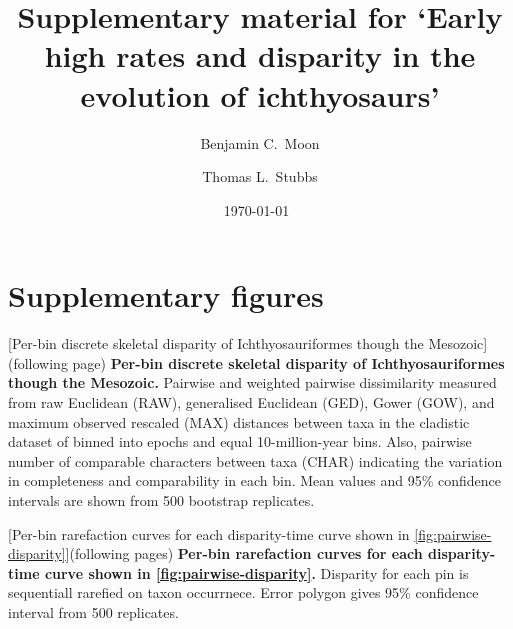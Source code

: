 \documentclass[british,a4paper]{article}
\title{Supplementary material for `Early high rates and disparity in the
evolution of ichthyosaurs'}
\author{Benjamin C.\ Moon \and Thomas L.\ Stubbs}
\date{\today~\version}
\makeatletter
\renewcommand\listoffigures{%
	    \@starttoc{lof}%
    }
\makeatother
\begin{document}
\maketitle

\tableofcontents


\section{Supplementary figures}\label{sec:supplemental-figures}

\listoffigures

[Per-bin discrete skeletal disparity of Ichthyosauriformes though
    the Mesozoic]{(following page) \textbf{Per-bin discrete skeletal disparity
    of Ichthyosauriformes though the Mesozoic.} Pairwise and weighted
    pairwise dissimilarity measured from raw Euclidean (RAW), generalised
    Euclidean (GED), Gower (GOW), and maximum observed rescaled (MAX)
    distances between taxa in the cladistic dataset of \textcite{Moon2018JSP}
    binned into epochs and equal 10-million-year bins. Also, pairwise number
    of comparable characters between taxa (CHAR) indicating the variation in
    completeness and comparability in each bin. Mean values and 95\%
    confidence intervals are shown from 500 bootstrap
    replicates.\label{fig:pairwise-disparity}}


[Per-bin rarefaction curves for each disparity-time curve
    shown in \cref{fig:pairwise-disparity}]{(following pages) \textbf{Per-bin
    rarefaction curves for each disparity-time curve shown in
    \cref{fig:pairwise-disparity}.} Disparity for each pin is sequentiall
    rarefied on taxon occurrnece. Error polygon gives 95\% confidence interval
    from 500 replicates.\label{fig:pd-rarefaction-curves}}

\end{document}
